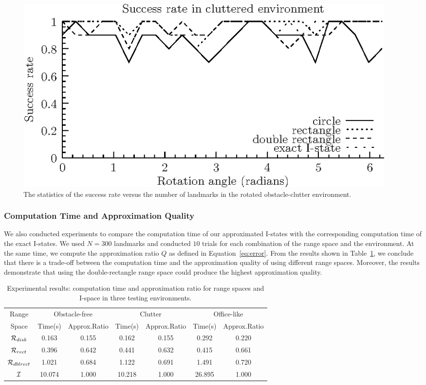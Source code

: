 \begin{figure}
  \begin{center}
    \includegraphics[width=0.95\textwidth]{figs/exp_rot_clutter}
  \end{center}
  \caption{The statistics of the success rate versus 
    the number of landmarks in the rotated obstacle-clutter environment.}
  \label{fig:sucRate5}
\end{figure}

\subsubsection{Computation Time and Approximation Quality}

We also conducted experiments to compare the computation time of our approximated
I-states with the corresponding computation time of the exact I-states.  
%
We used $N=300$ landmarks and conducted $10$ trials for each combination of the range space
and the environment.  
%
At the same time, we compute the approximation ratio $Q$ as defined in Equation~\ref{eq:error}.  
%
From the results shown in Table~\ref{tab:exp-data}, 
we conclude that there is a trade-off between the computation time and the approximation quality of using different range spaces. 
%
Moreover, the results demonstrate that using the double-rectangle range space could produce the highest approximation quality.

\begin{table}
  \small\centering
  \caption{Experimental results: computation time and approximation
      ratio for range spaces and I-space in three testing environments.}
    \begin{tabular}{ccccccc} 
    \toprule 
    Range  & \multicolumn{2}{c}{Obstacle-free} & \multicolumn{2}{c}{Clutter} & \multicolumn{2}{c}{Office-like}\\
    Space & Time(s) &Approx.Ratio& Time(s) &Approx.Ratio& Time(s) &Approx.Ratio \\
    \midrule
    $\mathcal{R}_{disk}$ & 0.163 & 0.155 & 0.162 & 0.155  & 0.292 & 0.220 \\ 
    \midrule
    $\mathcal{R}_{rect}$ & 0.396 & 0.642  & 0.441 & 0.632 & 0.415 & 0.661 \\
    \midrule
    $\mathcal{R}_{dblrect}$ & 1.021 & 0.684 & 1.122 & 0.691 & 1.491 & 0.720 \\
    \midrule
    $\mathcal{I}$ & 10.074 & 1.000 & 10.218 & 1.000 & 26.895 & 1.000 \\
    \bottomrule     
    \end{tabular}
    \label{tab:exp-data}
\end{table}


